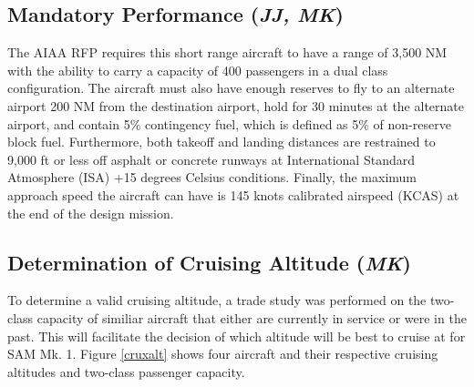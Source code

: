\subsection{Mandatory Performance (\textit{JJ, MK})}
\label{mand}
The AIAA RFP \cite{RFP} requires this short range aircraft to have a range of 3,500 NM with the ability to carry a capacity of 400 passengers in a dual class configuration. The aircraft must also have enough reserves to fly to an alternate airport 200 NM from the destination airport, hold for 30 minutes at the alternate airport, and contain 5\% contingency fuel, which is defined as 5\% of non-reserve block fuel. Furthermore, both takeoff and landing distances are restrained to 9,000 ft or less off asphalt or concrete runways at International Standard Atmosphere (ISA) +15 degrees Celsius conditions. Finally, the maximum approach speed the aircraft can have is 145 knots calibrated airspeed (KCAS) at the end of the design mission. 



\subsection{Determination of Cruising Altitude (\textit{MK})}
To determine a valid cruising altitude, a trade study was performed on the two-class capacity of similiar aircraft that either are currently in service or were in the past. This will facilitate the decision of which altitude will be best to cruise at for SAM Mk. 1. Figure \ref{cruxalt} shows four aircraft and their respective cruising altitudes and two-class passenger capacity\cite{butterworth}.

